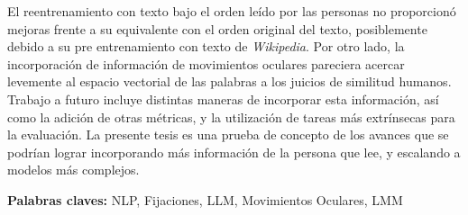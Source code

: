 El reentrenamiento con texto bajo el orden leído por las personas no proporcionó mejoras frente a su equivalente con el orden original del texto, posiblemente debido a su pre entrenamiento con texto de \textit{Wikipedia}. Por otro lado, la incorporación de información de movimientos oculares pareciera acercar levemente al espacio vectorial de las palabras a los juicios de similitud humanos. Trabajo a futuro incluye distintas maneras de incorporar esta información, así como la adición de otras métricas, y la utilización de tareas más extrínsecas para la evaluación. La presente tesis es una prueba de concepto de los avances que se podrían lograr incorporando más información de la persona que lee, y escalando a modelos más complejos.




\bigskip

\noindent\textbf{Palabras claves:} NLP, Fijaciones, LLM, Movimientos Oculares, LMM